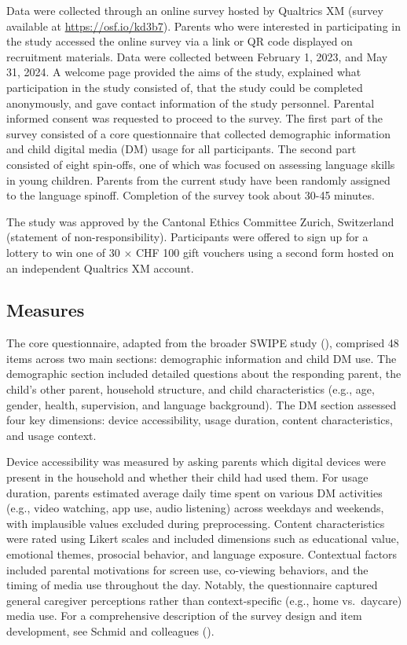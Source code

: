 \documentclass[
  man,
  floatsintext,
  longtable,
  nolmodern,
  notxfonts,
  notimes,
  colorlinks=true,linkcolor=blue,citecolor=blue,urlcolor=blue]{apa7}
\begin{document}
Data were collected through an online survey hosted by Qualtrics XM
(survey available at \url{https://osf.io/kd3b7}). Parents who were
interested in participating in the study accessed the online survey via
a link or QR code displayed on recruitment materials. Data were
collected between February 1, 2023, and May 31, 2024. A welcome page
provided the aims of the study, explained what participation in the
study consisted of, that the study could be completed anonymously, and
gave contact information of the study personnel. Parental informed
consent was requested to proceed to the survey. The first part of the
survey consisted of a core questionnaire that collected demographic
information and child digital media (DM) usage for all participants. The
second part consisted of eight spin-offs, one of which was focused on
assessing language skills in young children. Parents from the current
study have been randomly assigned to the language spinoff. Completion of
the survey took about 30-45 minutes.

The study was approved by the Cantonal Ethics Committee Zurich,
Switzerland (statement of non-responsibility). Participants were offered
to sign up for a lottery to win one of 30 $\times$ CHF 100 gift vouchers using
a second form hosted on an independent Qualtrics XM account.

\subsection{Measures}\label{measures}

The core questionnaire, adapted from the broader SWIPE study
(),
comprised 48 items across two main sections: demographic information and
child DM use. The demographic section included detailed questions about
the responding parent, the child's other parent, household structure,
and child characteristics (e.g., age, gender, health, supervision, and
language background). The DM section assessed four key dimensions:
device accessibility, usage duration, content characteristics, and usage
context.

Device accessibility was measured by asking parents which digital
devices were present in the household and whether their child had used
them. For usage duration, parents estimated average daily time spent on
various DM activities (e.g., video watching, app use, audio listening)
across weekdays and weekends, with implausible values excluded during
preprocessing. Content characteristics were rated using Likert scales
and included dimensions such as educational value, emotional themes,
prosocial behavior, and language exposure. Contextual factors included
parental motivations for screen use, co-viewing behaviors, and the
timing of media use throughout the day. Notably, the questionnaire
captured general caregiver perceptions rather than context-specific
(e.g., home vs.~daycare) media use. For a comprehensive description of
the survey design and item development, see Schmid and colleagues
().
\end{document}
